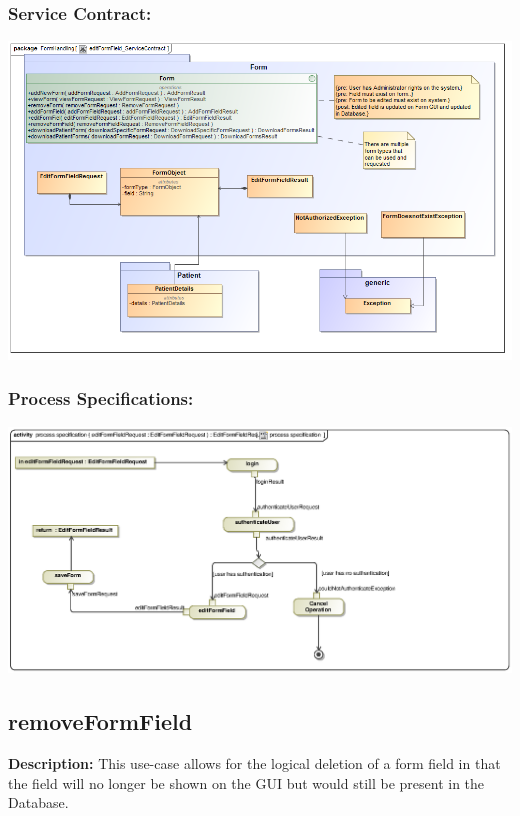 \subsubsection{Service Contract:} 
\includegraphics[width=1\linewidth]{./Graphics/FormUseCaseDiagrams/editFormField_ServiceContract}
\subsubsection{Process Specifications:} 
\includegraphics[width=1\linewidth]{./Graphics/FormUseCaseDiagrams/processspecification_editField}





\subsection{removeFormField}
\textbf{Description:}
This use-case allows for the logical deletion of a form field in that the field will no longer be shown on the GUI but would still be present in the Database.

